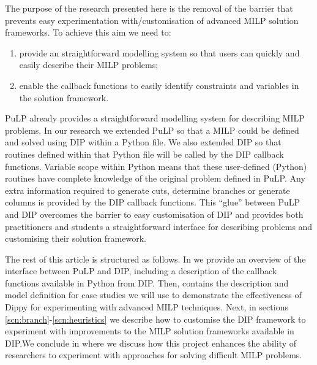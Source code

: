 The purpose of the research presented here is the removal of the barrier that prevents easy experimentation with/customisation of advanced \ac{MILP} solution frameworks. To achieve this aim we need to:
\begin{enumerate}
\item provide an straightforward modelling system so that users can quickly and easily describe their \ac{MILP} problems;
\item enable the callback functions to easily identify constraints and variables in the solution framework.
\end{enumerate}
PuLP already provides a straightforward modelling system for describing \ac{MILP} problems. In our research we extended PuLP so that a \ac{MILP} could be defined and solved using \ac{DIP} \cite{decomp04} within a Python file. We also extended \ac{DIP} so that routines defined within that Python file will be called by the \ac{DIP} callback functions. Variable scope within Python means that these user-defined (Python) routines have complete knowledge of the original problem defined in PuLP. Any extra information required to generate cuts, determine branches or generate columns is provided by the \ac{DIP} callback functions. This ``glue'' between PuLP and \ac{DIP} overcomes the barrier to easy customisation of \ac{DIP} and provides both practitioners and students a straightforward interface for describing problems and customising their solution framework.

The rest of this article is structured as follows. In  we provide an overview of the interface between PuLP and \ac{DIP}, including a description of the callback functions available in Python from \ac{DIP}. Then,  contains the description and model definition for case studies we will use to demonstrate the effectiveness of Dippy for experimenting with advanced \ac{MILP} techniques. Next, in sections \ref{scn:branch}-\ref{scn:heuristics} we describe how to customise the \ac{DIP} framework to experiment with improvements to the \ac{MILP} solution frameworks available in \ac{DIP}.We conclude in  where we discuss how this project enhances the ability of researchers to experiment with approaches for solving difficult \ac{MILP} problems.
